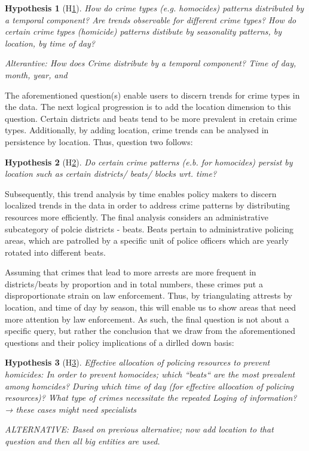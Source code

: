 \documentclass[a4paper]{article}
\newtheorem{hyp}{Hypothesis}
\begin{document}
\begin{hyp}[H\ref{hyp:first}] \label{hyp:first}
How do crime types (e.g. homocides) patterns distributed by a temporal component? Are trends observable for different crime types?
How do certain crime types (homicide) patterns distibute by seasonality patterns, by location, by time of day?


Alterantive: How does Crime distribute by a temporal component? Time of day, month, year, and 
\end{hyp}

The aforementioned question(s) enable users to discern trends for crime types in the data. The next logical progression is to add the location dimension to this question. Certain districts and beats tend to be more prevalent in cretain crime types. Additionally, by adding location, crime trends can be analysed in persistence by location. Thus, question two follows:

\begin{hyp}[H\ref{hyp:second}] \label{hyp:second}
Do certain crime patterns (e.b. for homocides) persist by location such as certain districts/ beats/ blocks wrt. time?
\end{hyp}

Subsequently, this trend analysis by time enables policy makers to discern localized trends in the data in order to address crime patterns by distributing resources more efficiently. The final analysis considers an administrative subcategory of polcie districts - beats. Beats pertain to administrative policing areas, which are patrolled by a specific unit of police officers which are yearly rotated into different beats. 


Assuming that crimes that lead to more arrests are more frequent in districts/beats by proportion and in total numbers, these crimes put a disproportionate strain on law enforcement. Thus, by triangulating attrests by location, and time of day by season, this will enable us to show areas that need more attention by law enforcement. As such, the final question is not about a specific query, but rather the conclusion that we draw from the aforementioned questions and their policy implications of a dirlled down basis:


\begin{hyp}[H\ref{hyp:third}] \label{hyp:third}
Effective allocation of policing resources to prevent homicides:
In order to prevent homocides; which “beats“ are the most prevalent among homcides? During which time of day (for effective allocation of policing resources)? 
 What type of crimes necessitate the repeated Loging of information? → these cases might need specialists
 
ALTERNATIVE: Based on previous alternative; now add location to that question and then all big entities are used. 
 
\end{hyp}
\end{document}
